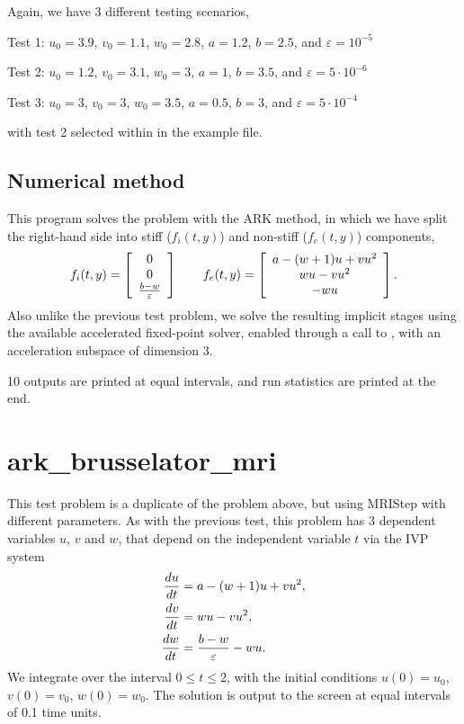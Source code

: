 \documentclass[letterpaper,10pt,english]{sphinxmanual}
\begin{document}
Again, we have 3 different testing scenarios,

Test 1:  \(u_0=3.9\),  \(v_0=1.1\),  \(w_0=2.8\),
\(a=1.2\), \(b=2.5\), and \(\varepsilon=10^{-5}\)

Test 2:  \(u_0=1.2\), \(v_0=3.1\), \(w_0=3\), \(a=1\),
\(b=3.5\), and \(\varepsilon=5\cdot10^{-6}\)

Test 3:  \(u_0=3\), \(v_0=3\), \(w_0=3.5\), \(a=0.5\),
\(b=3\), and \(\varepsilon=5\cdot10^{-4}\)

with test 2 selected within in the example file.


\subsection{Numerical method}
\label{c_serial:id9}
This program solves the problem with the ARK method, in which we have
split the right-hand side into stiff (\(f_i(t,y)\)) and non-stiff
(\(f_e(t,y)\)) components,
\begin{gather}
\begin{split}f_i(t,y) = \left[\begin{array}{c}
   0 \\ 0 \\ \frac{b-w}{\varepsilon}
\end{array}\right]
\qquad
f_e(t,y) = \left[\begin{array}{c}
   a - (w+1)u + v u^2 \\ w u - v u^2 \\ - w u
\end{array}\right].\end{split}\notag
\end{gather}
Also unlike the previous test problem, we solve the resulting implicit
stages using the available accelerated fixed-point solver, enabled
through a call to , with an acceleration
subspace of dimension 3.

10 outputs are printed at equal intervals, and run statistics
are printed at the end.


\section{ark\_brusselator\_mri}
\label{c_serial:id10}\label{c_serial:ark-brusselator-mri}
This test problem is a duplicate of the  problem
above, but using MRIStep with different parameters.  As with the
previous test, this problem has 3 dependent variables \(u\), \(v\) and
\(w\), that depend on the independent variable \(t\) via the IVP system
\begin{gather}
\begin{split}\frac{du}{dt} &= a - (w+1)u + v u^2, \\
\frac{dv}{dt} &= w u - v u^2, \\
\frac{dw}{dt} &= \frac{b-w}{\varepsilon} - w u.\end{split}\notag
\end{gather}
We integrate over the interval \(0 \le t \le 2\), with the
initial conditions \(u(0) = u_0\), \(v(0) = v_0\), \(w(0)
= w_0\).  The solution is output to the screen at equal intervals of 0.1 time
units.
\end{document}
